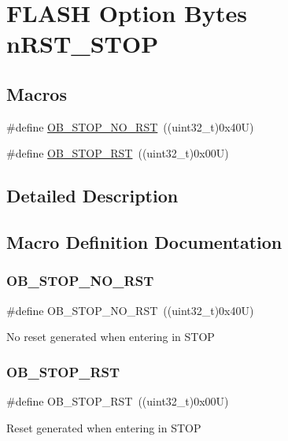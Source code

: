 \hypertarget{group___f_l_a_s_h_ex___option___bytes__n_r_s_t___s_t_o_p}{}\section{F\+L\+A\+SH Option Bytes n\+R\+S\+T\+\_\+\+S\+T\+OP}
\label{group___f_l_a_s_h_ex___option___bytes__n_r_s_t___s_t_o_p}
\subsection*{Macros}
\begin{DoxyCompactItemize}
\item 
\#define \mbox{\hyperlink{group___f_l_a_s_h_ex___option___bytes__n_r_s_t___s_t_o_p_ga7344fe0ec25c5eb2d11db7c855325436}{O\+B\+\_\+\+S\+T\+O\+P\+\_\+\+N\+O\+\_\+\+R\+ST}}~((uint32\+\_\+t)0x40\+U)
\item 
\#define \mbox{\hyperlink{group___f_l_a_s_h_ex___option___bytes__n_r_s_t___s_t_o_p_gaef92c03b1f279c532bfa13d3bb074b57}{O\+B\+\_\+\+S\+T\+O\+P\+\_\+\+R\+ST}}~((uint32\+\_\+t)0x00\+U)
\end{DoxyCompactItemize}


\subsection{Detailed Description}


\subsection{Macro Definition Documentation}
\mbox{\label{group___f_l_a_s_h_ex___option___bytes__n_r_s_t___s_t_o_p_ga7344fe0ec25c5eb2d11db7c855325436}} 
\subsubsection{\texorpdfstring{OB\_STOP\_NO\_RST}{OB\_STOP\_NO\_RST}}
{\footnotesize\ttfamily \#define O\+B\+\_\+\+S\+T\+O\+P\+\_\+\+N\+O\+\_\+\+R\+ST~((uint32\+\_\+t)0x40\+U)}

No reset generated when entering in S\+T\+OP \mbox{\label{group___f_l_a_s_h_ex___option___bytes__n_r_s_t___s_t_o_p_gaef92c03b1f279c532bfa13d3bb074b57}} 
\subsubsection{\texorpdfstring{OB\_STOP\_RST}{OB\_STOP\_RST}}
{\footnotesize\ttfamily \#define O\+B\+\_\+\+S\+T\+O\+P\+\_\+\+R\+ST~((uint32\+\_\+t)0x00\+U)}

Reset generated when entering in S\+T\+OP 